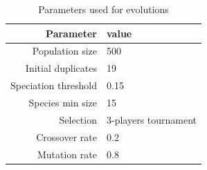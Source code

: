 \begin{table}
\center
\begin{tabular}{rl}
Parameter			& value 					\\\hline
Population size		& 500					\\
Initial duplicates		& 19					\\
Speciation threshold 	& 0.15					\\
Species min size		& 15					\\
Selection				& 3-players tournament	\\
Crossover rate		& 0.2					\\
Mutation rate			& 0.8					\\
\end{tabular}
\caption{Parameters used for evolutions}\label{tab:GREAT:params}
\end{table}



